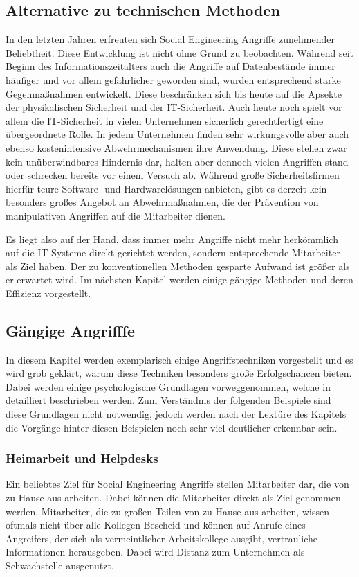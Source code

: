 \subsection{Alternative zu technischen Methoden}\label{sec:alternative_zu_technischen_methoden}
In den letzten Jahren erfreuten sich Social Engineering Angriffe zunehmender Beliebtheit.
Diese Entwicklung ist nicht ohne Grund zu beobachten.
Während seit Beginn des Informationszeitalters auch die Angriffe auf Datenbestände immer häufiger und
vor allem gefährlicher geworden sind, wurden entsprechend starke Gegenmaßnahmen entwickelt.
Diese beschränken sich bis heute auf die Apsekte der physikalischen Sicherheit und der IT-Sicherheit.
Auch heute noch spielt vor allem die IT-Sicherheit in vielen Unternehmen sicherlich gerechtfertigt
eine übergeordnete Rolle.
In jedem Unternehmen finden sehr wirkungsvolle aber auch ebenso kostenintensive Abwehrmechanismen ihre
Anwendung.
Diese stellen zwar kein unüberwindbares Hindernis dar, halten aber dennoch vielen Angriffen stand oder
schrecken bereits vor einem Versuch ab.
Während große Sicherheitsfirmen hierfür teure Software- und Hardwarelösungen anbieten, gibt es derzeit
kein besonders großes Angebot an Abwehrmaßnahmen, die der Prävention von manipulativen Angriffen auf
die Mitarbeiter dienen.

Es liegt also auf der Hand, dass immer mehr Angriffe nicht mehr herkömmlich auf die IT-Systeme direkt
gerichtet werden, sondern entsprechende Mitarbeiter als Ziel haben.
Der zu konventionellen Methoden gesparte Aufwand ist größer als er erwartet wird.
Im nächsten Kapitel werden einige gängige Methoden und deren Effizienz vorgestellt.

\subsection{Gängige Angrifffe}\label{sec:gangige_angriffe}
In diesem Kapitel werden exemplarisch einige Angriffstechniken vorgestellt und es wird grob geklärt,
warum diese Techniken besonders große Erfolgschancen bieten.
Dabei werden einige psychologische Grundlagen vorweggenommen, welche in  detailliert
beschrieben werden.
Zum Verständnis der folgenden Beispiele sind diese Grundlagen nicht notwendig, jedoch werden nach der
Lektüre des Kapitels  die Vorgänge hinter diesen Beispielen noch sehr viel
deutlicher erkennbar sein.

\subsubsection{Heimarbeit und Helpdesks}\label{heimarbeitundhelpdesks}
Ein beliebtes Ziel für Social Engineering Angriffe stellen Mitarbeiter dar, die von zu Hause aus
arbeiten.
Dabei können die Mitarbeiter direkt als Ziel genommen werden. Mitarbeiter, die zu großen Teilen von zu
Hause aus arbeiten, wissen oftmals nicht über alle Kollegen Bescheid und können auf Anrufe eines
Angreifers, der sich als vermeintlicher Arbeitskollege ausgibt, vertrauliche Informationen
herausgeben. Dabei wird Distanz zum Unternehmen als Schwachstelle ausgenutzt.

